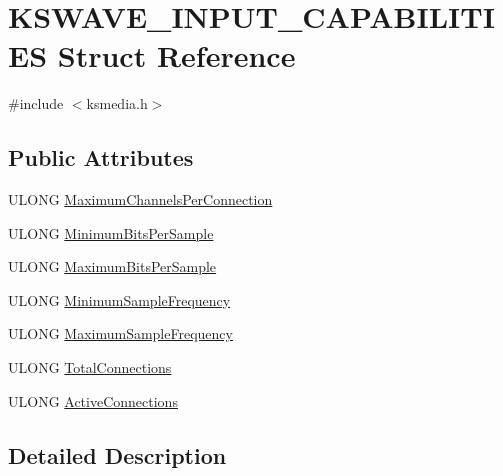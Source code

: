 \hypertarget{struct_k_s_w_a_v_e___i_n_p_u_t___c_a_p_a_b_i_l_i_t_i_e_s}{}\section{K\+S\+W\+A\+V\+E\+\_\+\+I\+N\+P\+U\+T\+\_\+\+C\+A\+P\+A\+B\+I\+L\+I\+T\+I\+ES Struct Reference}
\label{struct_k_s_w_a_v_e___i_n_p_u_t___c_a_p_a_b_i_l_i_t_i_e_s}


{\ttfamily \#include $<$ksmedia.\+h$>$}

\subsection*{Public Attributes}
\begin{DoxyCompactItemize}
\item 
U\+L\+O\+NG \hyperlink{struct_k_s_w_a_v_e___i_n_p_u_t___c_a_p_a_b_i_l_i_t_i_e_s_abe6bd3e87af927f1f886c729a159f8c6}{Maximum\+Channels\+Per\+Connection}
\item 
U\+L\+O\+NG \hyperlink{struct_k_s_w_a_v_e___i_n_p_u_t___c_a_p_a_b_i_l_i_t_i_e_s_add8ad7910686178eff800eeddba480da}{Minimum\+Bits\+Per\+Sample}
\item 
U\+L\+O\+NG \hyperlink{struct_k_s_w_a_v_e___i_n_p_u_t___c_a_p_a_b_i_l_i_t_i_e_s_aef5b37e2ddb666806181a2ddca624962}{Maximum\+Bits\+Per\+Sample}
\item 
U\+L\+O\+NG \hyperlink{struct_k_s_w_a_v_e___i_n_p_u_t___c_a_p_a_b_i_l_i_t_i_e_s_a4736003740f49a9e1473990c0c2fb4e7}{Minimum\+Sample\+Frequency}
\item 
U\+L\+O\+NG \hyperlink{struct_k_s_w_a_v_e___i_n_p_u_t___c_a_p_a_b_i_l_i_t_i_e_s_a11bf2b0d2ac87ce3ed39dcfa3b1bfe77}{Maximum\+Sample\+Frequency}
\item 
U\+L\+O\+NG \hyperlink{struct_k_s_w_a_v_e___i_n_p_u_t___c_a_p_a_b_i_l_i_t_i_e_s_a7dd51b6ee1cf93d356ad0e2c63c9f82e}{Total\+Connections}
\item 
U\+L\+O\+NG \hyperlink{struct_k_s_w_a_v_e___i_n_p_u_t___c_a_p_a_b_i_l_i_t_i_e_s_a8103fbf062508a753975c85dfeda99b0}{Active\+Connections}
\end{DoxyCompactItemize}


\subsection{Detailed Description}


